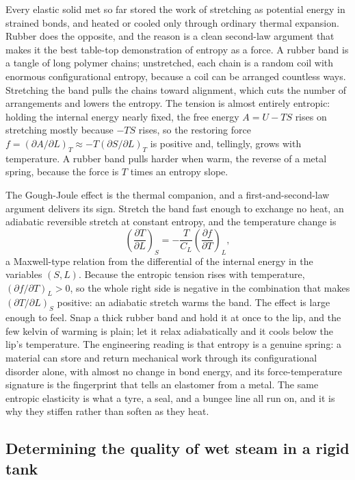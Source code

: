 Every elastic solid met so far stored the work of stretching as potential energy
in strained bonds, and heated or cooled only through ordinary thermal expansion.
Rubber does the opposite, and the reason is a clean second-law argument that
makes it the best table-top demonstration of entropy as a force. A rubber band is
a tangle of long polymer chains; unstretched, each chain is a random coil with
enormous configurational entropy, because a coil can be arranged countless ways.
Stretching the band pulls the chains toward alignment, which cuts the number of
arrangements and lowers the entropy. The tension is almost entirely entropic:
holding the internal energy nearly fixed, the free energy $A = U - TS$ rises on
stretching mostly because $-TS$ rises, so the restoring force $f = (\partial A/
\partial L)_T \approx -T(\partial S/\partial L)_T$ is positive and, tellingly,
grows with temperature. A rubber band pulls harder when warm, the reverse of a
metal spring, because the force is $T$ times an entropy slope.

The Gough-Joule effect is the thermal companion, and a first-and-second-law
argument delivers its sign. Stretch the band fast enough to exchange no heat, an
adiabatic reversible stretch at constant entropy, and the temperature change is
\[
\left(\frac{\partial T}{\partial L}\right)_S = -\frac{T}{C_L}
\left(\frac{\partial f}{\partial T}\right)_L,
\]
a Maxwell-type relation from the differential of the internal energy in the
variables $(S, L)$. Because the entropic tension rises with temperature,
$(\partial f/\partial T)_L > 0$, so the whole right side is negative in the
combination that makes $(\partial T/\partial L)_S$ positive: an adiabatic stretch
warms the band. The effect is large enough to feel. Snap a thick rubber band and
hold it at once to the lip, and the few kelvin of warming is plain; let it relax
adiabatically and it cools below the lip's temperature. The engineering reading is
that entropy is a genuine spring: a material can store and return mechanical work
through its configurational disorder alone, with almost no change in bond energy,
and its force-temperature signature is the fingerprint that tells an elastomer
from a metal. The same entropic elasticity is what a tyre, a seal, and a bungee
line all run on, and it is why they stiffen rather than soften as they heat.

\subsection{Determining the quality of wet steam in a rigid tank}

